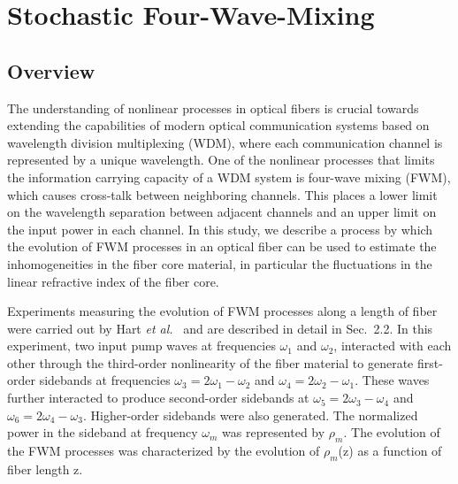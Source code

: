 
\renewcommand{\thechapter}{2}

\chapter{Stochastic Four-Wave-Mixing}

\section{Overview}

The understanding of nonlinear processes in optical fibers is crucial towards
extending the capabilities of modern optical communication systems based on
wavelength division multiplexing (WDM), where each communication channel is
represented by a unique wavelength. One of the nonlinear processes that
limits the information carrying capacity of a WDM system is four-wave mixing
(FWM), which causes cross-talk between neighboring channels. This places a
lower limit on the wavelength separation between adjacent channels and an
upper limit on the input power in each channel. In this study, we describe
a process by which the evolution of FWM processes in an optical fiber can be
used to estimate the inhomogeneities in the fiber core material, in particular
the fluctuations in the linear refractive index of the fiber core.

Experiments measuring the evolution of FWM processes along a length of fiber
were carried out by Hart {\it et al.}\ \cite{hart1} and are described in detail in
Sec.\ 2.2. In this experiment, two input pump waves at frequencies
$\omega_1$ and $\omega_2$, interacted with each other through the third-order
nonlinearity of the fiber material to generate first-order sidebands at frequencies
$\omega_3 = 2\omega_1 - \omega_2$ and $\omega_4 = 2\omega_2 - \omega_1$.
These waves further interacted to produce second-order sidebands at
$\omega_5 = 2\omega_3 - \omega_4$ and $\omega_6 = 2\omega_4 - \omega_3$.
Higher-order sidebands were also generated. The normalized power in the
sideband at frequency $\omega_m$ was represented by $\rho_m$. The
evolution of the FWM processes was characterized by the evolution of
$\rho_m$(z) as a function of fiber length z.


